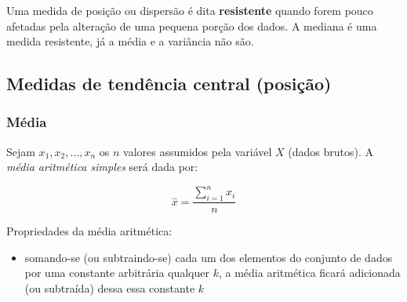 \documentclass[
]{book}
\providecommand{\tightlist}{%
  \setlength{\itemsep}{0pt}\setlength{\parskip}{0pt}}
\begin{document}
Uma medida de posição ou dispersão é dita \textbf{resistente} quando forem pouco afetadas pela alteração de uma pequena porção dos dados. A mediana é uma medida resistente, já a média e a variância não são.

\hypertarget{medidas-de-tenduxeancia-central-posiuxe7uxe3o}{%
\subsection{Medidas de tendência central (posição)}\label{medidas-de-tenduxeancia-central-posiuxe7uxe3o}}

\hypertarget{muxe9dia}{%
\subsubsection{Média}\label{muxe9dia}}

Sejam \(x_{1}, x_{2}, ..., x_{n}\) os \(n\) valores assumidos pela variável \(X\) (dados brutos). A \emph{média aritmética simples} será dada por:

\[
\stackrel{-}{x}=\frac{\sum _{i=1}^{n}{x}_{i}}{n}
\]

Propriedades da média aritmética:

\begin{itemize}
\tightlist
\item
  somando-se (ou subtraindo-se) cada um dos elementos do conjunto de dados por uma constante arbitrária qualquer \(k\), a média aritmética ficará adicionada (ou subtraída) dessa essa constante \(k\)
\end{itemize}
\end{document}
